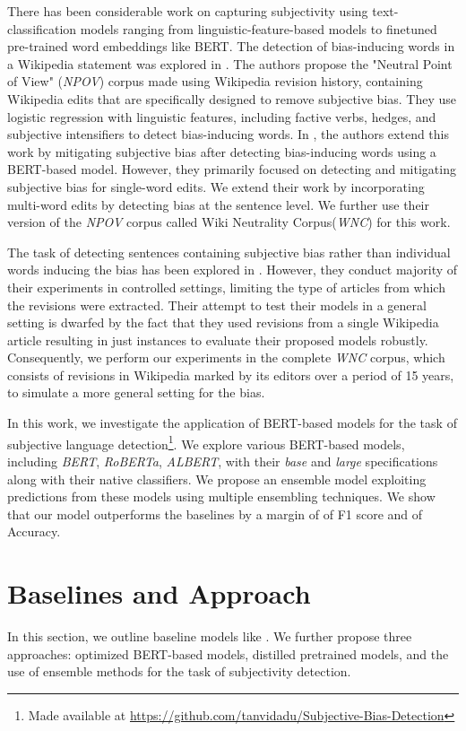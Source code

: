 \documentclass[sigconf,nonacm]{acmart}
\begin{document}
There has been considerable work on capturing subjectivity using text-classification models ranging from linguistic-feature-based models\cite{Recasens2013} to finetuned pre-trained word embeddings like BERT\cite{Jurafsky2020}. The detection of bias-inducing words in a Wikipedia statement was explored in \cite{Recasens2013}. The authors propose the "Neutral Point of View" (\textit{NPOV}) corpus made using Wikipedia revision history, containing Wikipedia edits that are specifically designed to remove subjective bias. They use logistic regression with linguistic features, including factive verbs, hedges, and subjective intensifiers to detect bias-inducing words. In \cite{Jurafsky2020}, the authors extend this work by mitigating subjective bias after detecting bias-inducing words using a BERT-based model. However, they primarily focused on detecting and mitigating subjective bias for single-word edits. We extend their work by incorporating multi-word edits by detecting bias at the sentence level. We further use their version of the \textit{NPOV} corpus called Wiki Neutrality Corpus(\textit{WNC}) for this work.

The task of detecting sentences containing subjective bias rather than individual words inducing the bias has been explored in \cite{hube2019neural}. However, they conduct majority of their experiments in controlled settings, limiting the type of articles from which the revisions were extracted. Their attempt to test their models in a general setting is dwarfed by the fact that they used revisions from a single Wikipedia article resulting in just  instances to evaluate their proposed models robustly. Consequently, we perform our experiments in the complete \textit{WNC} corpus, which consists of  revisions in Wikipedia marked by its editors over a period of 15 years, to simulate a more general setting for the bias.

In this work, we investigate the application of BERT-based models for the task of subjective language detection\footnote{Made available at \url{https://github.com/tanvidadu/Subjective-Bias-Detection}}. We explore various BERT-based models, including \textit{BERT}, \textit{RoBERTa}, \textit{ALBERT}, with their \textit{base} and \textit{large} specifications along with their native classifiers. We propose an ensemble model exploiting predictions from these models using multiple ensembling techniques. We show that our model outperforms the baselines by a margin of  of F1 score and  of Accuracy.

\section{Baselines and Approach}
In this section, we outline baseline models like . We further propose three approaches: optimized BERT-based models, distilled pretrained models, and the use of ensemble methods for the task of subjectivity detection.
\end{document}
